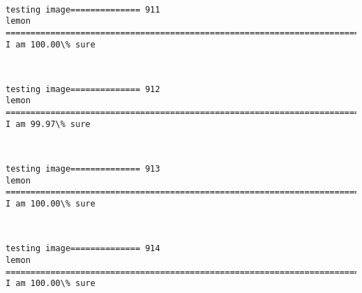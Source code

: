 \documentclass[11pt]{article}
\begin{document}
    \begin{center}
    \end{center}
    { \hspace*{\fill} \\}
    
    \begin{Verbatim}[commandchars=\\\{\}]
testing image============== 911
lemon
============================================================================
I am 100.00\% sure

    \end{Verbatim}

    \begin{center}
    \end{center}
    { \hspace*{\fill} \\}
    
    \begin{Verbatim}[commandchars=\\\{\}]
testing image============== 912
lemon
============================================================================
I am 99.97\% sure

    \end{Verbatim}

    \begin{center}
    \end{center}
    { \hspace*{\fill} \\}
    
    \begin{Verbatim}[commandchars=\\\{\}]
testing image============== 913
lemon
============================================================================
I am 100.00\% sure

    \end{Verbatim}

    \begin{center}
    \end{center}
    { \hspace*{\fill} \\}
    
    \begin{Verbatim}[commandchars=\\\{\}]
testing image============== 914
lemon
============================================================================
I am 100.00\% sure

    \end{Verbatim}
\end{document}

